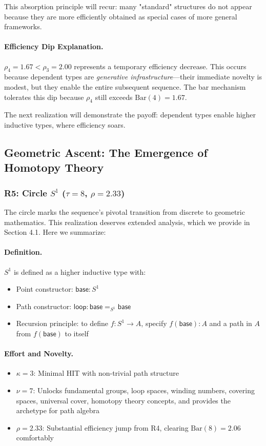 \documentclass[11pt]{article}
\theoremstyle{definition}
\begin{document}
This absorption principle will recur: many "standard" structures do not appear because they are more efficiently obtained as special cases of more general frameworks.

\paragraph{Efficiency Dip Explanation.}
$\rho_4 = 1.67 < \rho_3 = 2.00$ represents a temporary efficiency decrease. This occurs because dependent types are \emph{generative infrastructure}—their immediate novelty is modest, but they enable the entire subsequent sequence. The bar mechanism tolerates this dip because $\rho_4$ still exceeds $\text{Bar}(4) = 1.67$.

The next realization will demonstrate the payoff: dependent types enable higher inductive types, where efficiency soars.

\subsection{Geometric Ascent: The Emergence of Homotopy Theory}

\subsubsection{R5: Circle $S^1$ ($\tau=8$, $\rho=2.33$)}

The circle marks the sequence's pivotal transition from discrete to geometric mathematics. This realization deserves extended analysis, which we provide in Section 4.1. Here we summarize:

\paragraph{Definition.}
$S^1$ is defined as a higher inductive type with:
\begin{itemize}
\item Point constructor: $\mathsf{base} : S^1$
\item Path constructor: $\mathsf{loop} : \mathsf{base} =_{S^1} \mathsf{base}$
\item Recursion principle: to define $f : S^1 \to A$, specify $f(\mathsf{base}) : A$ and a path in $A$ from $f(\mathsf{base})$ to itself
\end{itemize}

\paragraph{Effort and Novelty.}
\begin{itemize}
\item $\kappa = 3$: Minimal HIT with non-trivial path structure
\item $\nu = 7$: Unlocks fundamental groups, loop spaces, winding numbers, covering spaces, universal cover, homotopy theory concepts, and provides the archetype for path algebra
\item $\rho = 2.33$: Substantial efficiency jump from R4, clearing $\text{Bar}(8) = 2.06$ comfortably
\end{itemize}
\end{document}

